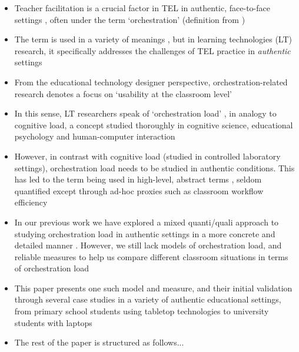\documentclass[10pt,journal,compsoc]{IEEEtran}
\begin{document}

\begin{itemize}
\item Teacher facilitation is a crucial factor in TEL in authentic, face-to-face settings \cite{Gomez2013,Onrubia2012}, often under the term `orchestration' (definition from \cite{Dillenbourg2009})
\item The term is used in a variety of meanings  \cite{Prieto2011}, but in learning technologies (LT) research, it specifically addresses the challenges of TEL practice in \textit{authentic} settings \cite{Roschelle2013}
\item From the educational technology designer perspective, orchestration-related research denotes a focus on `usability at the classroom level' \cite{Dillenbourg2011}
\item In this sense, LT researchers speak of `orchestration load' \cite{Dillenbourg2013,Cuendet2013,munoz2013sharing}, in analogy to cognitive load, a concept studied thoroughly in cognitive science, educational psychology and human-computer interaction \cite{sweller1994cognitive,oviatt2006human}
\item However, in contrast with cognitive load (studied in controlled laboratory settings), orchestration load needs to be studied in authentic conditions. This has led to the term being used in high-level, abstract terms \cite{Dillenbourg2013,Cuendet2013}, seldom quantified except through ad-hoc proxies such as classroom workflow efficiency \cite{Alavi2012}
\item In our previous work we have explored a mixed quanti/quali approach to studying orchestration load in authentic settings in a more concrete and detailed manner \cite{Prieto2015ectel}. However, we still lack models of orchestration load, and reliable measures to help us compare different classroom situations in terms of orchestration load
\item This paper presents one such model and measure, and their initial validation through several case studies in a variety of authentic educational settings, from primary school students using tabletop technologies to university students with laptops
\item The rest of the paper is structured as follows...
\end{itemize}


\end{document}
